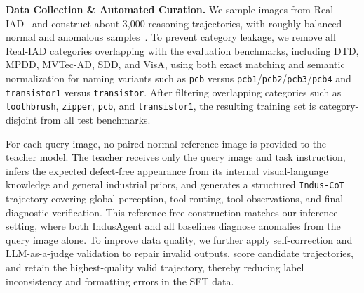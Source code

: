 \documentclass{article}
\begin{document}
\textbf{Data Collection \& Automated Curation.}
We sample images from Real-IAD~\citep{wang2024realiad} and construct about 3,000 reasoning trajectories, with roughly balanced normal and anomalous samples~\citep{wang2023selfinstruct}. 
To prevent category leakage, we remove all Real-IAD categories overlapping with the evaluation benchmarks, including DTD, MPDD, MVTec-AD, SDD, and VisA, using both exact matching and semantic normalization for naming variants such as \texttt{pcb} versus \texttt{pcb1}/\texttt{pcb2}/\texttt{pcb3}/\texttt{pcb4} and \texttt{transistor1} versus \texttt{transistor}. 
After filtering overlapping categories such as \texttt{toothbrush}, \texttt{zipper}, \texttt{pcb}, and \texttt{transistor1}, the resulting training set is category-disjoint from all test benchmarks.

For each query image, no paired normal reference image is provided to the teacher model. 
The teacher receives only the query image and task instruction, infers the expected defect-free appearance from its internal visual-language knowledge and general industrial priors, and generates a structured \texttt{Indus-CoT} trajectory covering global perception, tool routing, tool observations, and final diagnostic verification. 
This reference-free construction matches our inference setting, where both IndusAgent and all baselines diagnose anomalies from the query image alone. 
To improve data quality, we further apply self-correction and LLM-as-a-judge validation to repair invalid outputs, score candidate trajectories, and retain the highest-quality valid trajectory, thereby reducing label inconsistency and formatting errors in the SFT data.
\end{document}
